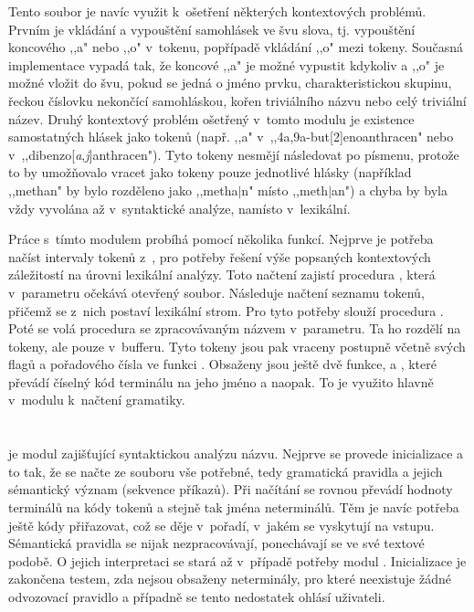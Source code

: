 Tento soubor je navíc využit k~ošetření některých kontextových problémů. Prvním
je vkládání a vypouštění samohlásek ve švu slova, tj. vypouštění koncového ,,a"
nebo ,,o" v~tokenu, popřípadě vkládání ,,o" mezi tokeny. Současná implementace
vypadá tak, že koncové ,,a" je možné vypustit kdykoliv a ,,o" je možné vložit
do švu, pokud se jedná o jméno prvku, charakteristickou skupinu, řeckou číslovku
nekončící samohláskou, kořen triviálního názvu nebo celý triviální název. Druhý
kontextový problém ošetřený v~tomto modulu je existence samostatných hlásek jako
tokenů (např. ,,a" v~,,4a,9a-but[2]enoanthracen" nebo
v~,,dibenzo[{\textit a},{\textit j}]anthracen"). Tyto tokeny nesmějí následovat
po písmenu, protože to by umožňovalo vracet jako tokeny pouze jednotlivé hlásky
(například ,,methan" by bylo rozděleno jako ,,metha$|$n" místo ,,meth$|$an") a
chyba by byla vždy vyvolána až v~syntaktické analýze, namísto v~lexikální.

Práce s~tímto modulem probíhá pomocí několika funkcí. Nejprve je po\-tře\-ba načíst
intervaly tokenů z~, pro potřeby řešení výše popsaných
kontextových záležitostí na úrovni lexikální analýzy. Toto načtení zajistí procedura
, která v~parametru očekává otevřený soubor.
Následuje načtení seznamu tokenů, přičemž se z~nich postaví lexikální strom. Pro
tyto potřeby slouží procedura . Poté se volá procedura
 se zpracovávaným názvem v~parametru. Ta ho rozdělí na tokeny,
ale pouze v~bufferu. Tyto tokeny jsou pak vraceny postupně včetně svých flagů a
pořadového čísla ve funkci . Obsaženy jsou ještě dvě funkce,
 a , které převádí číselný kód
terminálu na jeho jméno a naopak. To je využito hlavně v~modulu 
k~načtení gramatiky.

\section{}
 je modul zajišťující syntaktickou analýzu názvu. Nejprve se
provede inicializace a to tak, že se načte ze souboru  vše
potřebné, tedy gramatická pravidla a jejich sémantický význam (sekvence příkazů).
Při načítání se rovnou převádí hodnoty terminálů na kódy tokenů a stejně tak
jména neterminálů. Těm je navíc potřeba ještě kódy přiřazovat, což se děje
v~pořadí, v~jakém se vyskytují na vstupu. Sémantická pravidla se nijak
nezpracovávají, ponechávají se ve své textové podobě. O jejich interpretaci se
stará až v~případě potřeby modul . Inicializace je zakončena
testem, zda nejsou obsaženy neterminály, pro které neexistuje žádné odvozovací
pravidlo a případně se tento nedostatek ohlásí uživateli.

